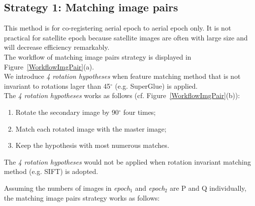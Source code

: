 \subsection{Strategy 1: Matching image pairs}
This method is for co-registering aerial epoch to aerial epoch only. It is not practical for satellite epoch because satellite images are often with large size and will decrease efficiency remarkably.\\
The workflow of matching image pairs strategy is displayed in Figure~\ref{WorkflowImgPair}(a).\\
We introduce \textit{4 rotation hypotheses} when feature matching method that is not invariant to rotations lager than 45$^\circ$ (e.g. SuperGlue) is applied.\\
The \textit{4 rotation hypotheses} works as follows (cf. Figure~\ref{WorkflowImgPair}(b)): 
\begin{enumerate}
    \item Rotate the secondary image by 90$^{\circ}$ four times;
    \item Match each rotated image with the master image;
    \item Keep the hypothesis with most numerous matches.
\end{enumerate}
The \textit{4 rotation hypotheses} would not be applied when rotation invariant matching method (e.g. SIFT) is adopted.
\par
Assuming the numbers of images in \textit{epoch$_1$} and \textit{epoch$_2$} are P and Q individually, the matching image pairs strategy works as follows:\\
